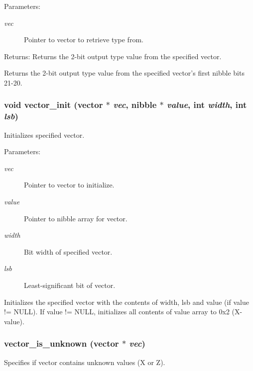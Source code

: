 \begin{Desc}
\item[Parameters:]
\begin{description}
\item[{\em vec}]Pointer to vector to retrieve type from.\end{description}
\end{Desc}
\begin{Desc}
\item[Returns:]Returns the 2-bit output type value from the specified vector.\end{Desc}
Returns the 2-bit output type value from the specified vector's first nibble bits 21-20. 
\subsubsection{\setlength{\rightskip}{0pt plus 5cm}void vector\_\-init ({\bf vector} $\ast$ {\em vec}, {\bf nibble} $\ast$ {\em value}, int {\em width}, int {\em lsb})}\label{vector_8c_a8}


Initializes specified vector. 

\begin{Desc}
\item[Parameters:]
\begin{description}
\item[{\em vec}]Pointer to vector to initialize. \item[{\em value}]Pointer to nibble array for vector. \item[{\em width}]Bit width of specified vector. \item[{\em lsb}]Least-significant bit of vector.\end{description}
\end{Desc}
Initializes the specified vector with the contents of width, lsb and value (if value != NULL). If value != NULL, initializes all contents of value array to 0x2 (X-value). 
\subsubsection{ vector\_\-is\_\-unknown ({\bf vector} $\ast$ {\em vec})}\label{vector_8c_a29}


Specifies if vector contains unknown values (X or Z). 

